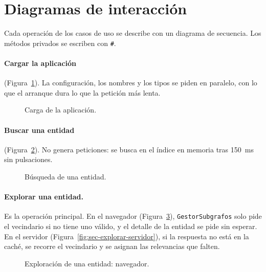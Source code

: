\section{Diagramas de interacción}
\label{sec:interaccion}

Cada operación de los casos de uso se describe con un diagrama de secuencia. Los métodos privados se escriben con \texttt{\#}. 

\paragraph{Cargar la aplicación} (Figura~\ref{fig:sec-cargar}). La configuración, los nombres y los tipos se piden en paralelo, con lo que el arranque dura lo que la petición más lenta.

\begin{figure}[htbp]
  \centering
  \caption{Carga de la aplicación.}
  \label{fig:sec-cargar}
\end{figure}

\paragraph{Buscar una entidad} (Figura~\ref{fig:sec-buscar}). No genera peticiones: se busca en el índice en memoria tras 150~ms sin pulsaciones.

\begin{figure}[htbp]
  \centering
  \caption{Búsqueda de una entidad.}
  \label{fig:sec-buscar}
\end{figure}

\paragraph{Explorar una entidad.} Es la operación principal. En el navegador (Figura~\ref{fig:sec-explorar-cliente}), \texttt{GestorSubgrafos} solo pide el vecindario si no tiene uno válido, y el detalle de la entidad se pide sin esperar. En el servidor (Figura~\ref{fig:sec-explorar-servidor}), si la respuesta no está en la caché, se recorre el vecindario y se asignan las relevancias que falten.

\begin{figure}
  \centering
  \caption{Exploración de una entidad: navegador.}
  \label{fig:sec-explorar-cliente}
\end{figure}

